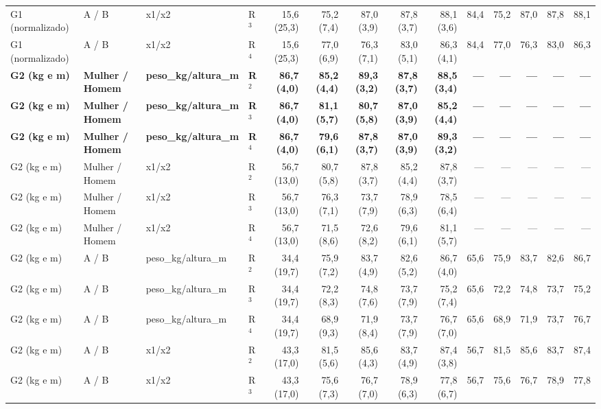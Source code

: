 \begin{table}[htbp]
\begin{tabular}{llllrrrrrrrrrr}
G1 (normalizado) & A / B & x1/x2 & R$^3$ & 15,6 (25,3) & 75,2 (7,4) & 87,0 (3,9) & 87,8 (3,7) & 88,1 (3,6) & 84,4 & 75,2 & 87,0 & 87,8 & 88,1 \\
G1 (normalizado) & A / B & x1/x2 & R$^4$ & 15,6 (25,3) & 77,0 (6,9) & 76,3 (7,1) & 83,0 (5,1) & 86,3 (4,1) & 84,4 & 77,0 & 76,3 & 83,0 & 86,3 \\
\textbf{G2 (kg e m)} & \textbf{Mulher / Homem} & \textbf{peso\_kg/altura\_m} & \textbf{R$^2$} & \textbf{86,7 (4,0)} & \textbf{85,2 (4,4)} & \textbf{89,3 (3,2)} & \textbf{87,8 (3,7)} & \textbf{88,5 (3,4)} & \textbf{—} & \textbf{—} & \textbf{—} & \textbf{—} & \textbf{—} \\
\textbf{G2 (kg e m)} & \textbf{Mulher / Homem} & \textbf{peso\_kg/altura\_m} & \textbf{R$^3$} & \textbf{86,7 (4,0)} & \textbf{81,1 (5,7)} & \textbf{80,7 (5,8)} & \textbf{87,0 (3,9)} & \textbf{85,2 (4,4)} & \textbf{—} & \textbf{—} & \textbf{—} & \textbf{—} & \textbf{—} \\
\textbf{G2 (kg e m)} & \textbf{Mulher / Homem} & \textbf{peso\_kg/altura\_m} & \textbf{R$^4$} & \textbf{86,7 (4,0)} & \textbf{79,6 (6,1)} & \textbf{87,8 (3,7)} & \textbf{87,0 (3,9)} & \textbf{89,3 (3,2)} & \textbf{—} & \textbf{—} & \textbf{—} & \textbf{—} & \textbf{—} \\
G2 (kg e m) & Mulher / Homem & x1/x2 & R$^2$ & 56,7 (13,0) & 80,7 (5,8) & 87,8 (3,7) & 85,2 (4,4) & 87,8 (3,7) & — & — & — & — & — \\
G2 (kg e m) & Mulher / Homem & x1/x2 & R$^3$ & 56,7 (13,0) & 76,3 (7,1) & 73,7 (7,9) & 78,9 (6,3) & 78,5 (6,4) & — & — & — & — & — \\
G2 (kg e m) & Mulher / Homem & x1/x2 & R$^4$ & 56,7 (13,0) & 71,5 (8,6) & 72,6 (8,2) & 79,6 (6,1) & 81,1 (5,7) & — & — & — & — & — \\
G2 (kg e m) & A / B & peso\_kg/altura\_m & R$^2$ & 34,4 (19,7) & 75,9 (7,2) & 83,7 (4,9) & 82,6 (5,2) & 86,7 (4,0) & 65,6 & 75,9 & 83,7 & 82,6 & 86,7 \\
G2 (kg e m) & A / B & peso\_kg/altura\_m & R$^3$ & 34,4 (19,7) & 72,2 (8,3) & 74,8 (7,6) & 73,7 (7,9) & 75,2 (7,4) & 65,6 & 72,2 & 74,8 & 73,7 & 75,2 \\
G2 (kg e m) & A / B & peso\_kg/altura\_m & R$^4$ & 34,4 (19,7) & 68,9 (9,3) & 71,9 (8,4) & 73,7 (7,9) & 76,7 (7,0) & 65,6 & 68,9 & 71,9 & 73,7 & 76,7 \\
G2 (kg e m) & A / B & x1/x2 & R$^2$ & 43,3 (17,0) & 81,5 (5,6) & 85,6 (4,3) & 83,7 (4,9) & 87,4 (3,8) & 56,7 & 81,5 & 85,6 & 83,7 & 87,4 \\
G2 (kg e m) & A / B & x1/x2 & R$^3$ & 43,3 (17,0) & 75,6 (7,3) & 76,7 (7,0) & 78,9 (6,3) & 77,8 (6,7) & 56,7 & 75,6 & 76,7 & 78,9 & 77,8 \\

\end{tabular}
\end{table}
